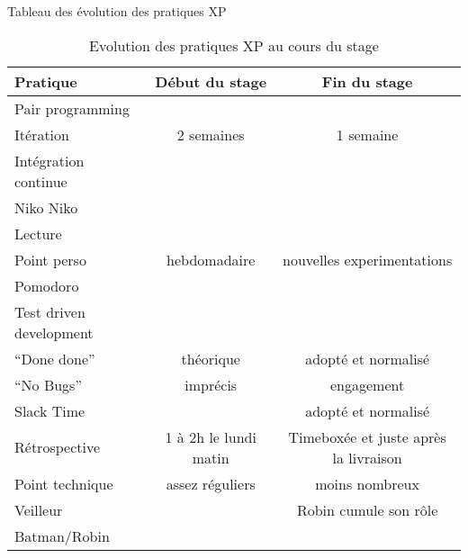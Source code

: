 Tableau des évolution des pratiques XP
\begin{table}[!ht]
	\caption{\label{tableau:evolPratXP}Evolution des pratiques XP au cours du stage}
	\begin{tabular}{|l|c|c|}
		\hline
		Pratique & Début du stage & Fin du stage\\
		\hline
		Pair programming & \tick & \tick \\
		Itération & 2 semaines & 1 semaine \\
		Intégration continue & \tick & \tick \\
		Niko Niko & \tick & \badtick \\
		Lecture & \tick & \badtick \\
		Point perso & hebdomadaire & nouvelles experimentations\\
		Pomodoro & \badtick & \tick \\
		Test driven development & \tick & \tick \\
		``Done done'' & théorique & adopté et normalisé\\
		``No Bugs'' & imprécis & engagement \\
		Slack Time & \badtick & adopté et normalisé\\
		Rétrospective & 1 à 2h le lundi matin & Timeboxée et juste après la livraison\\
		Point technique & assez réguliers & moins nombreux\\
		Veilleur & \tick & Robin cumule son rôle\\
		Batman/Robin & \badtick & \tick \\
		\hline
	\end{tabular}
\end{table}

